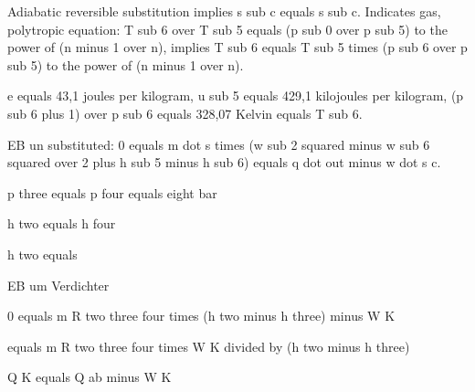 Adiabatic reversible substitution implies s sub c equals s sub c. Indicates gas, polytropic equation: T sub 6 over T sub 5 equals (p sub 0 over p sub 5) to the power of (n minus 1 over n), implies T sub 6 equals T sub 5 times (p sub 6 over p sub 5) to the power of (n minus 1 over n).

e equals 43,1 joules per kilogram, u sub 5 equals 429,1 kilojoules per kilogram, (p sub 6 plus 1) over p sub 6 equals 328,07 Kelvin equals T sub 6.

EB un substituted: 0 equals m dot s times (w sub 2 squared minus w sub 6 squared over 2 plus h sub 5 minus h sub 6) equals q dot out minus w dot s c.

p three equals p four equals eight bar

h two equals h four

h two equals

EB um Verdichter

0 equals m R two three four times (h two minus h three) minus W K

equals m R two three four times W K divided by (h two minus h three)

Q K equals Q ab minus W K